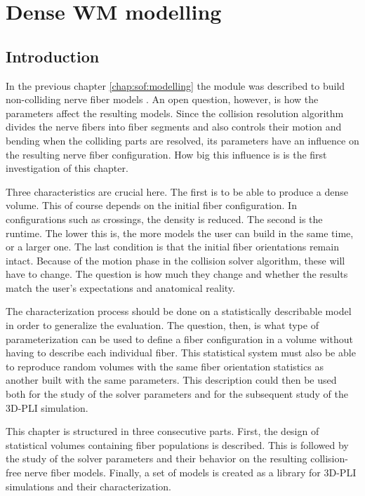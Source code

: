 \setcounter{chapter}{6}
\chapter{Dense \acs{WM} modelling}
\label{cha:model_analysis}
% 
\section{Introduction}
% 
In the previous chapter \cref{chap:sof:modelling} the module  was described to build non-colliding nerve fiber models \cite{Matuschke2019, Matuschke2021}.
An open question, however, is how the parameters affect the resulting models.
Since the collision resolution algorithm divides the nerve fibers into fiber segments and also controls their motion and bending when the colliding parts are resolved, its parameters have an influence on the resulting nerve fiber configuration.
How big this influence is is the first investigation of this chapter.
\par
% 
Three characteristics are crucial here.
The first is to be able to produce a dense volume.
This of course depends on the initial fiber configuration.
In configurations such as crossings, the density is reduced.
The second is the runtime.
The lower this is, the more models the user can build in the same time, or a larger one. 
The last condition is that the initial fiber orientations remain intact.
Because of the motion phase in the collision solver algorithm, these will have to change.
The question is how much they change and whether the results match the user's expectations and anatomical reality.
\par
% 
The characterization process should be done on a statistically describable model in order to generalize the evaluation. The question, then, is what type of parameterization can be used to define a fiber configuration in a volume without having to describe each individual fiber.
This statistical system must also be able to reproduce random volumes with the same fiber orientation statistics as another built with the same parameters.
This description could then be used both for the study of the solver parameters and for the subsequent study of the \ac{3D-PLI} simulation.
\par
% 
This chapter is structured in three consecutive parts.
First, the design of statistical volumes containing fiber populations is described.
This is followed by the study of the solver parameters and their behavior on the resulting collision-free nerve fiber models.
Finally, a set of models is created as a library for \ac{3D-PLI} simulations and their characterization.
% 
% 
% 
